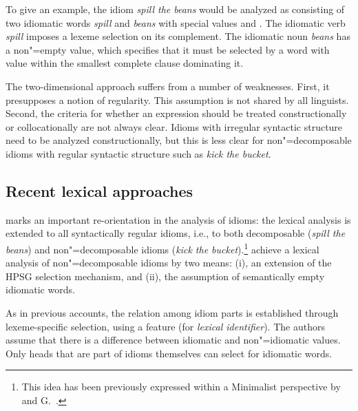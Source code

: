 \documentclass[output=paper
 	        ,biblatex
                ,babelshorthands
                ,newtxmath
                ,draftmode
                ,colorlinks, citecolor=brown
]{langscibook}
\begin{document}
To give an example, the idiom \emph{spill the beans} would be analyzed as consisting of two
idiomatic words \emph{spill} and \emph{beans} with special  values  and
\mbox{}. The idiomatic verb \emph{spill} imposes a lexeme selection on its
complement. The idiomatic noun \emph{beans} has a non"=empty  value, which specifies that
it must be selected by a word with  value  within the smallest complete
clause dominating it.


The two-dimensional approach suffers from a number of weaknesses.  First, it presupposes a notion of
regularity. This assumption is not shared by all linguists.  Second, the criteria for whether an
expression should be treated constructionally or collocationally are not always clear.  Idioms with
irregular syntactic structure need to be analyzed constructionally, but this is less clear for
non"=decomposable idioms with regular syntactic structure such as \emph{kick the bucket}.



\subsection{Recent lexical approaches}
\label{Sec-RecentLexical}\label{idioms:recent-lexical-approaches}

\citet{KSF2015a} marks an important re-orientation in the analysis of idioms: the lexical analysis
is extended to all syntactically regular idioms, i.e., to both decomposable (\emph{spill the beans})
and non"=decomposable idioms (\emph{kick the bucket}).\footnote{This idea has been previously
  expressed within a Minimalist perspective by  and G.\ .  }
%
\citet{KSF2015a} achieve a lexical analysis of non"=decomposable idioms by two means: (i), an
extension of the HPSG selection mechanism, and (ii), the assumption of semantically empty idiomatic
words.  

As in previous accounts, the relation among idiom parts is established through lexeme-specific
selection, using a feature  (for \emph{lexical identifier}).  The authors assume that
there is a difference between idiomatic and non"=idiomatic  values.  Only heads that are
part of idioms themselves can select for idiomatic words.
\end{document}
